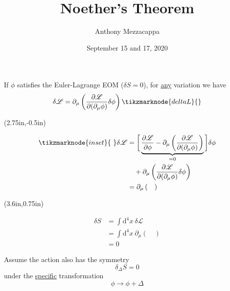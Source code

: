 \documentclass{article}
\title{Noether's Theorem}
\author{Anthony Mezzacappa}
\date{September 15 and 17, 2020}
\begin{document}
\setlength{\parskip}{1em}

\maketitle

\noindent If $\phi$ satisfies the Euler-Lagrange EOM ($\delta S = 0$), for \underline{any} variation we have
\begin{equation*}
    \delta \mathscr{L} = \partial_\mu \left( \dfrac{ \partial \mathscr{L} }{ \partial ( \partial_\mu \phi ) } \delta \phi \right) \tikzmarknode{deltaL}{}
\end{equation*}

{%
\begin{textblock*}{3.25in}(2.75in,-0.5in)%
\begin{minipage}[h!]{3.25in}
    \begin{align*}
        \tikzmarknode{inset}{~} \delta \mathscr{L} &= \bigg[ \underbrace{ \dfrac{ \partial \mathscr{L} }{ \partial \phi } - \partial_\mu \left( \dfrac{ \partial \mathscr{L} }{ \partial ( \partial_\mu \phi ) } \right) }_{=0} \bigg] \delta \phi \\
        &\quad + \partial_\mu \left( \dfrac{ \partial \mathscr{L} }{ \partial ( \partial_\mu \phi ) } \delta \phi \right) \\
        &= \partial_\mu \left( \quad \right)
    \end{align*}
\end{minipage}%
\end{textblock*}%
}

{%
\begin{textblock*}{3.25in}(3.6in,0.75in)%
\begin{minipage}[h!]{3.25in}
    \begin{align*}
        \delta S &= \int \mathrm{d}^4 x~ \delta \mathscr{L} \\
        &= \int \mathrm{d}^4 x~ \partial_\mu ( \quad ) \\
        &= 0
    \end{align*}
\end{minipage}%
\end{textblock*}%
}


\noindent Assume the action also has the symmetry
\begin{equation*}
    \delta_\Delta S = 0
\end{equation*}
under the \underline{specific} transformation
\begin{equation*}
    \phi \longrightarrow \phi + \Delta
\end{equation*}
\end{document}
